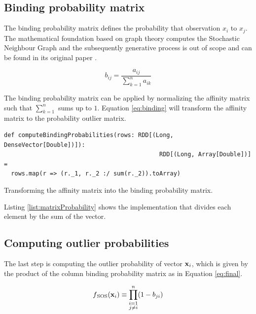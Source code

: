 \subsection{Binding probability matrix \label{subsec:bindingprob}}

The binding probability matrix defines the probability that observation $x_{i}$ to $x_{j}$. The mathematical foundation based on graph theory computes the Stochastic Neighbour Graph and the subsequently generative process is out of scope and can be found in its original paper \cite{MSU:CSE:00:2}.

\begin{equation}
b_{ij} = \frac{a_{ij}}{\sum_{k=1}^{n}a_{ik}}
\label{eq:binding}
\end{equation}

The binding probability matrix can be applied by normalizing the affinity matrix such that $\sum_{k=1}^{n}$ sums up to $1$. Equation \ref{eq:binding} will transform the affinity matrix to the probability outlier matrix.

\begin{listing}[ht!]
\begin{verbatim}
def computeBindingProbabilities(rows: RDD[(Long, DenseVector[Double])]): 
                                            RDD[(Long, Array[Double])] = 
  rows.map(r => (r._1, r._2 :/ sum(r._2)).toArray)
\end{verbatim}

\caption{Transforming the affinity matrix into the binding probability matrix.}
\label{list:matrixProbability}
\end{listing}

Listing \ref{list:matrixProbability} shows the implementation that divides each element by the sum of the vector.

\subsection{Computing outlier probabilities \label{subsec:outlierprobabilities}}

The last step is computing the outlier probability of vector ${\bf x}_{i}$, which is given by the product of the column binding probability matrix as in Equation \ref{eq:final}.

\begin{equation}
f{_\text{SOS}}({\bf x}_{i}) \equiv \prod^{n}_{\substack{i=1\\j \neq i}}(1-b_{ji}) \label{eq:final}
\end{equation}

